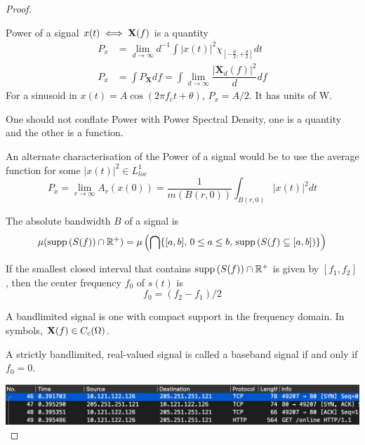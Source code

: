 \documentclass[../../main.tex]{subfiles}
\begin{document}
\begin{proof}
\begin{definition}
    Power of a signal $x(t)\iff \bf{X}(f)$ is a quantity
    \begin{align*}
    P_x &= \lim_{d\to\infty}d^{-1}\int|x(t)|^2\chi_{\left[-\frac{d}{2},+\frac{d}{2}\right]}dt\\[2ex]
    P_x &= \int P_{\mathbf{X}}df = \int \lim_{d\to\infty}\dfrac{|\mathbf{X}_d(f)|^2}{d}df
    \end{align*}
    For a sinusoid in $x(t)=A\cos(2\pi f_c t+\theta)$, $P_x=A/2$. It has units of W.
\end{definition}
\begin{remark}
    One should not conflate Power with Power Spectral Density, one is a quantity and the other is a function.
\end{remark}
An alternate characterisation of the Power of a signal would be to use the average function for some $|x(t)|^2\in L^1_{loc}$
\[
P_x=\lim_{r\to\infty}A_r(x(0))=\dfrac{1}{m(B(r,0))}\int_{B(r,0)}|x(t)|^2dt
\]
\begin{definition}
    The absolute bandwidth $B$ of a signal is 
    \[
    \mu(\supp{S(f)}\cap\mathbb{R}^+)=\mu\left(\bigcap\{[a,b],\,0\leq a\leq b,\,\supp{S(f)\subseteq[a,b]}\}\right)
    \]
\end{definition}
\begin{definition}
    If the smallest closed interval that contains $\supp{S(f)}\cap\mathbb{R}^+$ is given by $[f_1,f_2]$, then the center frequency $f_0$ of $s(t)$ is
    \[
    f_0 = (f_2-f_1)/2
    \]
\end{definition}
\begin{definition}
    A bandlimited signal is one with compact support in the frequency domain. In symbols, $\xf\in C_c(\Omega)$.
\end{definition}
\begin{definition}
    A strictly bandlimited, real-valued signal is called a baseband signal if and only if $f_0=0$.
\end{definition}
\begin{wtr}

\end{wtr}
\includegraphics[width=\textwidth]{subfiles/images/ECSE_308_Lab_5_1_SUPA_PAGE1_0_Image27.png}
\end{proof}
\end{document}
